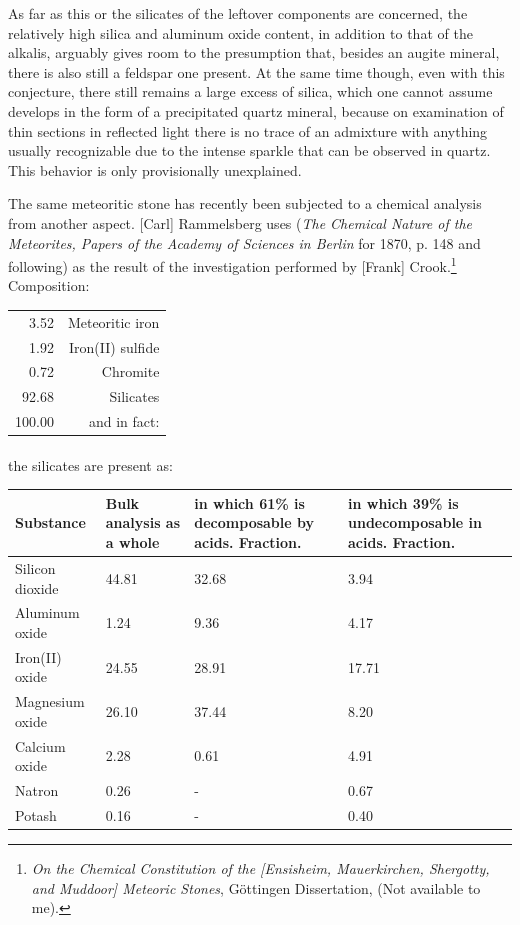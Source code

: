 \documentclass[a4paper, 12pt, oneside]{article}
\begin{document}
As far as this or the silicates of the leftover components are concerned, the relatively high silica and aluminum oxide content, in addition to that of the alkalis, arguably gives room to the presumption that, besides an augite mineral, there is also still a feldspar one present. At the same time though, even with this conjecture, there still remains a large excess of silica, which one cannot assume develops in the form of a precipitated quartz mineral, because on examination of thin sections in reflected light there is no trace of an admixture with anything usually recognizable due to the intense sparkle that can be observed in quartz. This behavior is only provisionally unexplained.

The same meteoritic stone has recently been subjected to a chemical analysis from another aspect. [Carl] Rammelsberg uses (\emph{The Chemical Nature of the Meteorites, Papers of the Academy of Sciences in Berlin} for 1870, p. 148 and following) as the result of the investigation performed by [Frank] Crook.\footnote{\emph{On the Chemical Constitution of the [Ensisheim, Mauerkirchen, Shergotty, and Muddoor] Meteoric Stones}, Göttingen Dissertation, (Not available to me).} Composition:
\begin{center}
    \begin{tabular}{r r}
        3.52 & Meteoritic iron\\
        1.92 & Iron(II) sulfide\\
        0.72 & Chromite\\
        92.68 & Silicates\\
        100.00 & and in fact:\\
    \end{tabular}
\end{center}
\paragraph*{}
the silicates are present as:
\begin{center}
    \tiny
    \begin{tabular}{ |l|p{1.5cm}|p{1.5cm}|p{1.5cm}| }
        \hline
        Substance & Bulk analysis as a whole & in which 61\% is decomposable by acids. Fraction. & in which 39\% is undecomposable in acids. Fraction.\\\hline
        Silicon dioxide & 44.81 & 32.68 & 3.94\\\hline
        Aluminum oxide & 1.24 & 9.36 & 4.17\\\hline
        Iron(II) oxide & 24.55 & 28.91 & 17.71\\\hline
        Magnesium oxide & 26.10 & 37.44 & 8.20\\\hline
        Calcium oxide & 2.28 & 0.61 & 4.91\\\hline
        Natron & 0.26 & - & 0.67\\\hline
        Potash & 0.16 & - & 0.40\\
        \hline
    \end{tabular}
\end{center}
\end{document}
